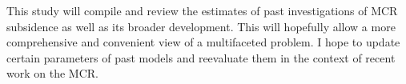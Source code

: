 \documentclass[11pt,a4paper]{article}
\begin{document}
This study will compile and review the estimates of past investigations of MCR subsidence as well as its broader development. This will hopefully allow a more comprehensive and convenient view of a multifaceted problem. I hope to update certain parameters of past models and reevaluate them in the context of recent work on the MCR. 




\end{document}

